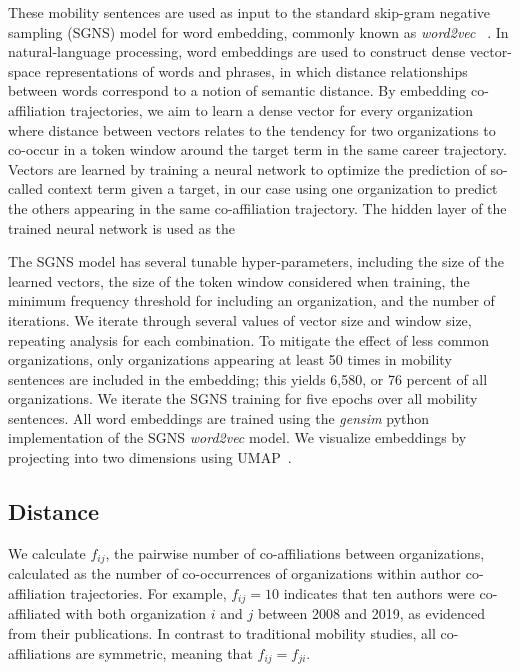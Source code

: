 \documentclass[12pt]{article} %
\begin{document}
These mobility sentences are used as input to the standard skip-gram negative sampling (SGNS) model for word embedding, commonly known as \textit{word2vec}~\cite{mikolov2013word2vec} . 
In natural-language processing, word embeddings are used to construct dense vector-space representations of words and phrases, in which distance relationships between words correspond to a notion of semantic distance. 
By embedding co-affiliation trajectories, we aim to learn a dense vector for every organization where distance between vectors relates to the tendency for two organizations to co-occur in a token window around the target term in the same career trajectory. 
Vectors are learned by training a neural network to optimize the prediction of so-called context term given a target, in our case using one organization to predict the others appearing in the same co-affiliation trajectory. 
The hidden layer of the trained neural network is used as the 

The SGNS model has several tunable hyper-parameters, including the size of the learned vectors, the size of the token window  considered when training, the minimum frequency threshold for including an organization, and the number of iterations.
We iterate through several values of vector size and window size, repeating analysis for each combination. 
To mitigate the effect of less common organizations, only organizations appearing at least 50 times in mobility sentences are included in the embedding;
this yields 6,580, or 76 percent of all organizations.
We iterate the SGNS training for five epochs over all mobility sentences. 
All word embeddings are trained using the \textit{gensim} python implementation of the SGNS \textit{word2vec} model. 
We visualize embeddings by projecting into two dimensions using UMAP~\cite{mcinnes2018umap}.

%
%
\subsection{Distance}
We calculate $f_{ij}$, the pairwise number of co-affiliations between organizations, calculated as the number of co-occurrences of organizations within author co-affiliation trajectories. 
For example, $f_{ij} = 10$ indicates that ten authors were co-affiliated with both organization $i$ and $j$ between 2008 and 2019, as evidenced from their publications. 
In contrast to traditional mobility studies, all co-affiliations are symmetric, meaning that $f_{ij} = f_{ji}$. 
\end{document}
